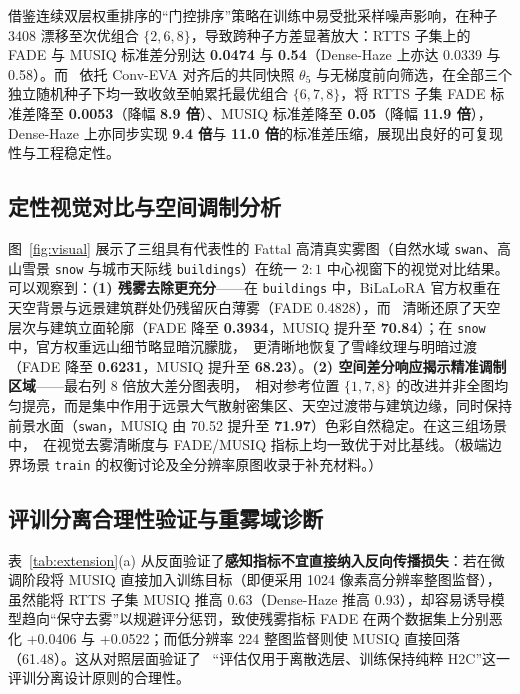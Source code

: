 \documentclass[10pt,twocolumn,letterpaper]{article}
\begin{document}
借鉴连续双层权重排序的“门控排序”策略在训练中易受批采样噪声影响，在种子 3408 漂移至次优组合 $\{2,6,8\}$，导致跨种子方差显著放大：RTTS 子集上的 FADE 与 MUSIQ 标准差分别达 \textbf{0.0474} 与 \textbf{0.54}（Dense-Haze 上亦达 0.0339 与 0.58）。而 \method~依托 Conv-EVA 对齐后的共同快照 $\theta_5$ 与无梯度前向筛选，在全部三个独立随机种子下均一致收敛至帕累托最优组合 $\{6,7,8\}$，将 RTTS 子集 FADE 标准差降至 \textbf{0.0053}（降幅 \textbf{8.9 倍}）、MUSIQ 标准差降至 \textbf{0.05}（降幅 \textbf{11.9 倍}），Dense-Haze 上亦同步实现 \textbf{9.4 倍}与 \textbf{11.0 倍}的标准差压缩，展现出良好的可复现性与工程稳定性。

\subsection{定性视觉对比与空间调制分析}
图~\ref{fig:visual} 展示了三组具有代表性的 Fattal 高清真实雾图（自然水域 \texttt{swan}、高山雪景 \texttt{snow} 与城市天际线 \texttt{buildings}）在统一 $2:1$ 中心视窗下的视觉对比结果。可以观察到：\textbf{(1) 残雾去除更充分}——在 \texttt{buildings} 中，BiLaLoRA 官方权重在天空背景与远景建筑群处仍残留灰白薄雾（FADE 0.4828），而 \method~清晰还原了天空层次与建筑立面轮廓（FADE 降至 \textbf{0.3934}，MUSIQ 提升至 \textbf{70.84}）；在 \texttt{snow} 中，官方权重远山细节略显暗沉朦胧，\method~更清晰地恢复了雪峰纹理与明暗过渡（FADE 降至 \textbf{0.6231}，MUSIQ 提升至 \textbf{68.23}）。\textbf{(2) 空间差分响应揭示精准调制区域}——最右列 8 倍放大差分图表明，\method~相对参考位置 $\{1,7,8\}$ 的改进并非全图均匀提亮，而是集中作用于远景大气散射密集区、天空过渡带与建筑边缘，同时保持前景水面（\texttt{swan}，MUSIQ 由 70.52 提升至 \textbf{71.97}）色彩自然稳定。在这三组场景中，\method~在视觉去雾清晰度与 FADE/MUSIQ 指标上均一致优于对比基线。（极端边界场景 \texttt{train} 的权衡讨论及全分辨率原图收录于补充材料。）

\subsection{评训分离合理性验证与重雾域诊断}
表~\ref{tab:extension}(a) 从反面验证了\textbf{感知指标不宜直接纳入反向传播损失}：若在微调阶段将 MUSIQ 直接加入训练目标（即便采用 1024 像素高分辨率整图监督），虽然能将 RTTS 子集 MUSIQ 推高 0.63（Dense-Haze 推高 0.93），却容易诱导模型趋向“保守去雾”以规避评分惩罚，致使残雾指标 FADE 在两个数据集上分别恶化 +0.0406 与 +0.0522；而低分辨率 224 整图监督则使 MUSIQ 直接回落（61.48）。这从对照层面验证了 \method~“评估仅用于离散选层、训练保持纯粹 H2C”这一评训分离设计原则的合理性。
\end{document}
